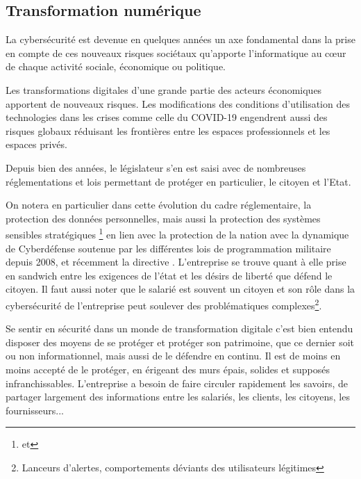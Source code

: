 \subsection {Transformation numérique}


La cybersécurité est devenue en quelques années un axe fondamental dans la prise en compte de ces nouveaux risques sociétaux qu'apporte l'informatique au cœur de chaque activité sociale, économique ou politique.

Les  transformations digitales d'une grande partie des acteurs économiques apportent de nouveaux risques. Les modifications des conditions d'utilisation des technologies dans les crises comme celle du COVID-19 engendrent aussi des risques globaux réduisant les frontières entre les espaces professionnels et les espaces privés.

Depuis bien des années, le législateur s'en est saisi avec de nombreuses réglementations et lois permettant de protéger en particulier, le citoyen et l'Etat.

On notera en particulier dans cette évolution du cadre réglementaire,  la protection des données personnelles, mais aussi la protection des systèmes sensibles stratégiques \footnote{  et  } en lien avec la protection de la nation avec la dynamique de Cyberdéfense soutenue par les différentes lois de programmation militaire depuis 2008, et récemment la directive  . L'entreprise se trouve quant à elle prise en sandwich entre les exigences de l'état et les désirs de liberté que défend le citoyen. Il faut aussi noter que le salarié est souvent un citoyen et son rôle dans la cybersécurité de l'entreprise peut soulever des problématiques complexes\footnote{Lanceurs d'alertes, comportements déviants des utilisateurs légitimes}.
 
Se sentir en sécurité dans un monde de transformation digitale c'est bien entendu disposer des moyens de se protéger et protéger son patrimoine, que ce dernier soit ou non informationnel, mais aussi de le défendre en continu. Il est de moins en moins accepté de le protéger, en érigeant des murs épais, solides et supposés infranchissables. L'entreprise a besoin de faire circuler rapidement les savoirs, de partager largement des informations entre les salariés, les clients, les citoyens, les fournisseurs...


